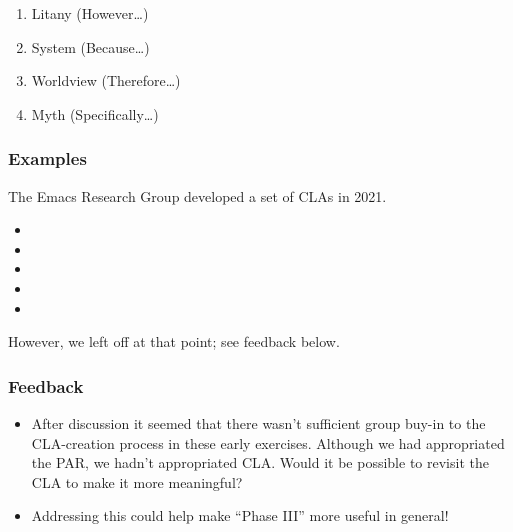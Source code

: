 \documentclass[11pt]{article}
\begin{document}
\begin{enumerate}
\item Litany (However\ldots{})
\item System (Because\ldots{})
\item Worldview (Therefore\ldots{})
\item Myth (Specifically\ldots{})
\end{enumerate}

\subsubsection{Examples}
\label{sec:org4fb1c0d}

The Emacs Research Group developed a set of CLAs in 2021.

\begin{itemize}
\item{}
\item{}
\item{}
\item{}
\item{}
\end{itemize}

However, we left off at that point; see feedback below.

\subsubsection{Feedback}
\label{sec:orgec3c179}

\begin{itemize}
\item After discussion it seemed that there wasn't sufficient group buy-in to the CLA-creation process in these early exercises.  Although we had appropriated the PAR, we hadn't appropriated CLA.  Would it be possible to revisit the CLA to make it more meaningful?
\item Addressing this could help make “Phase III” more useful in general!
\end{itemize}
\end{document}
